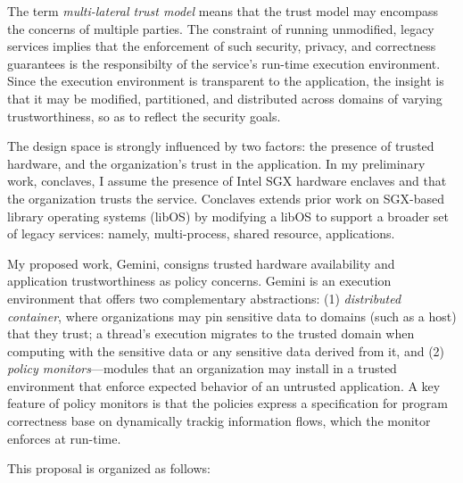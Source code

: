 

The term \emph{multi-lateral trust model} means that the trust model may
encompass the concerns of multiple parties.
%
The constraint of running unmodified, legacy services implies that the
enforcement of such security, privacy, and correctness guarantees is the
responsibilty of the service's run-time execution environment. 
%
Since the execution environment is transparent to the application, the insight
is that it may be modified, partitioned, and distributed across domains of
varying trustworthiness, so as to reflect the security goals.


The design space is strongly influenced by two factors: the presence of trusted
hardware, and the organization's trust in the application.
%
%
In my preliminary work, conclaves, I assume the presence of Intel SGX hardware
enclaves and that the organization trusts the service.
%
Conclaves extends prior work on SGX-based library operating systems (libOS) by
modifying a libOS to support a broader set of legacy services: namely,
multi-process, shared resource, applications.

%


My proposed work, Gemini, consigns trusted hardware availability and
application trustworthiness as policy concerns.
%
Gemini is an execution environment that offers two complementary abstractions:
(1) \emph{distributed container}, where organizations may pin sensitive data to
domains (such as a host) that they trust; a thread's execution migrates to the
trusted domain when computing with the sensitive data or any sensitive data
derived from it, and (2) \emph{policy monitors}---modules that an organization
may install in a trusted environment that enforce expected behavior of an
untrusted application.
%
A key feature of policy monitors is that the policies express a specification
for program correctness base on dynamically trackig information flows, which
the monitor enforces at run-time.

This proposal is organized as follows:

